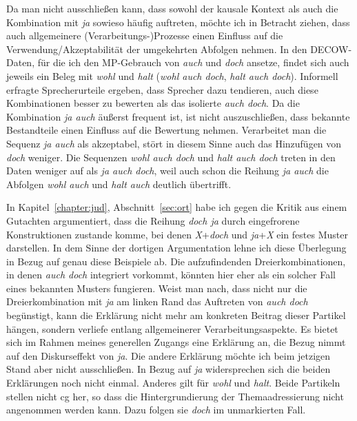 {Da man nicht ausschließen kann, dass sowohl der kausale Kontext als auch die Kombination mit \textit{ja} sowieso häufig auftreten, möchte ich in Betracht ziehen, dass auch allgemeinere (Verarbeitungs-)Prozesse einen Einfluss auf die Verwendung/Akzeptabilität der umgekehrten Abfolgen nehmen. In den DECOW-Daten, für die ich den MP-Gebrauch von \textit{auch} und \textit{doch} ansetze, findet sich auch jeweils ein Beleg mit \textit{wohl} und \textit{halt} (\textit{wohl auch doch}, \textit{halt auch doch}). Informell erfragte Sprecherurteile ergeben, dass Sprecher dazu tendieren, auch diese Kombinationen besser zu bewerten als das isolierte \textit{auch doch}. Da die Kombination \textit{ja auch} äußerst frequent ist, ist nicht auszuschließen, dass \glq bekannte Bestandteile\grq {} einen Einfluss auf die Bewertung nehmen. Verarbeitet man die Sequenz \textit{ja auch} als akzeptabel, stört in diesem Sinne auch das Hinzufügen von \textit{doch} weniger. Die Sequenzen \textit{wohl auch doch} und \textit{halt auch doch} treten in den Daten weniger auf als \textit{ja auch doch}, weil auch schon die Reihung \textit{ja auch} die Abfolgen \textit{wohl auch} und \textit{halt auch} deutlich übertrifft.

In Kapitel~\ref{chapter:jud}, Abschnitt~\ref{sec:ort} habe ich gegen die Kritik aus einem Gutachten argumentiert, dass die Reihung \textit{doch ja} durch eingefrorene Konstruktionen zustande komme, bei denen \textit{X}+\textit{doch} und \textit{ja}+\textit{X} ein festes Muster darstellen. In dem Sinne der dortigen Argumentation lehne ich diese Überlegung in Bezug auf genau diese Beispiele ab. Die aufzufindenden Dreierkombinationen, in denen \textit{auch doch} integriert vorkommt, könnten hier eher als ein solcher Fall eines bekannten Musters fungieren. Weist man nach, dass nicht nur die Dreierkombination mit \textit{ja} am linken Rand das Auftreten von \textit{auch doch} begünstigt, kann die Erklärung nicht mehr am konkreten Beitrag dieser Partikel hängen, sondern verliefe entlang allgemeinerer Verarbeitungsaspekte. Es bietet sich im Rahmen meines generellen Zugangs eine Erklärung an, die Bezug nimmt auf den Diskurseffekt von \textit{ja}. Die andere Erklärung möchte ich beim jetzigen Stand aber nicht ausschließen. In Bezug auf \textit{ja} widersprechen sich die beiden Erklärungen noch nicht einmal. Anderes gilt für \textit{wohl} und \textit{halt}. Beide Partikeln stellen nicht cg her, so dass die Hintergrundierung der Themaadressierung nicht angenommen werden kann. Dazu folgen sie \textit{doch} im unmarkierten Fall. 

}

